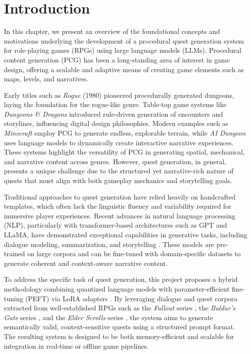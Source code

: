 \clearpage

\chapter{Introduction}

In this chapter, we present an overview of the foundational concepts and motivations
underlying the development of a procedural quest generation system for role-playing games
(RPGs) using large language models (LLMs). Procedural content generation (PCG) has
been a long-standing area of interest in game design, offering a scalable and adaptive
means of creating game elements such as maps, levels, and narratives.

Early titles such as \textit{Rogue} (1980) \cite{rogue1980} pioneered procedurally generated dungeons, laying
the foundation for the rogue-like genre. Table-top game systems like \textit{Dungeons \&
Dragons} \cite{dungeonsanddragons} introduced rule-driven generation of encounters and storylines, influencing
digital design philosophies. Modern examples such as \textit{Minecraft} \cite{minecraft} employ PCG to generate
endless, explorable terrain, while \textit{AI Dungeon} \cite{ai-dungeon} uses language models to dynamically
create interactive narrative experiences. These systems highlight the versatility of PCG
in generating spatial, mechanical, and narrative content across genres. However, quest
generation, in general, presents a unique challenge due to the structured yet narrative-rich
nature of quests that must align with both gameplay mechanics and storytelling goals.

Traditional approaches to quest generation have relied heavily on handcrafted templates,
which often lack the linguistic fluency and variability required for immersive player
experiences. Recent advances in natural language processing (NLP), particularly with
transformer-based architectures such as GPT and LLaMA, have demonstrated exceptional
capabilities in generative tasks, including dialogue modeling, summarization, and
storytelling \cite{vaswani2017attention,brown2020language}. These models are pre-trained on large corpora and can be fine-tuned
with domain-specific datasets to generate coherent and context-aware narrative content.

To address the specific task of quest generation, this project proposes a hybrid methodology
combining quantized language models with parameter-efficient fine-tuning (PEFT)
via LoRA adapters \cite{peft}. By leveraging dialogue and quest corpora extracted from well-established
RPGs such as the \textit{Fallout} series \cite{fallout1,fallout2}, the \textit{Baldur's Gate} series \cite{baldursgate,baldursgate2shadowsofamn}, and the
\textit{Elder Scrolls} series \cite{theelderscrollsivoblivion,theelderscrollsvskyrim}, the system aims to generate semantically valid, context-sensitive
quests using a structured prompt format. The resulting system is designed to be both
memory-efficient and scalable for integration in real-time or offline game pipelines.

